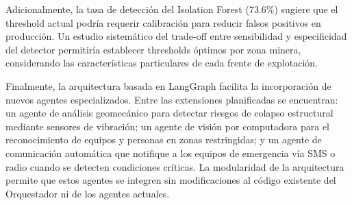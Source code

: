 \documentclass[journal,onecolumn]{IEEEtran}
\begin{document}
Adicionalmente, la tasa de detección del Isolation Forest (73.6\%) sugiere que el threshold actual podría requerir calibración para reducir falsos positivos en producción. Un estudio sistemático del trade-off entre sensibilidad y especificidad del detector permitiría establecer thresholds óptimos por zona minera, considerando las características particulares de cada frente de explotación.

Finalmente, la arquitectura basada en LangGraph facilita la incorporación de nuevos agentes especializados. Entre las extensiones planificadas se encuentran: un agente de análisis geomecánico para detectar riesgos de colapso estructural mediante sensores de vibración; un agente de visión por computadora para el reconocimiento de equipos y personas en zonas restringidas; y un agente de comunicación automática que notifique a los equipos de emergencia vía SMS o radio cuando se detecten condiciones críticas. La modularidad de la arquitectura permite que estos agentes se integren sin modificaciones al código existente del Orquestador ni de los agentes actuales.


\appendices





\end{document}
